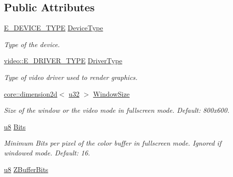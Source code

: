 \subsection*{Public Attributes}
\begin{DoxyCompactItemize}
\item 
\hyperlink{namespaceirr_ac25d94cf2e1037c7ca18ee79b3bd4505}{E\+\_\+\+D\+E\+V\+I\+C\+E\+\_\+\+T\+Y\+PE} \hyperlink{structirr_1_1SIrrlichtCreationParameters_a76520addbdf96ee3b3f00cb7f55076e5}{Device\+Type}
\begin{DoxyCompactList}\small\item\em Type of the device. \end{DoxyCompactList}\item 
\hyperlink{namespaceirr_1_1video_ae35a6de6d436c76107ad157fe42356d0}{video\+::\+E\+\_\+\+D\+R\+I\+V\+E\+R\+\_\+\+T\+Y\+PE} \hyperlink{structirr_1_1SIrrlichtCreationParameters_a1ea2f50c3b3a8eed6602a1a86e1cdf82}{Driver\+Type}
\begin{DoxyCompactList}\small\item\em Type of video driver used to render graphics. \end{DoxyCompactList}\item 
\hyperlink{classirr_1_1core_1_1dimension2d}{core\+::dimension2d}$<$ \hyperlink{namespaceirr_a0416a53257075833e7002efd0a18e804}{u32} $>$ \hyperlink{structirr_1_1SIrrlichtCreationParameters_a1b596e201a6ebd63ca2841d46be10433}{Window\+Size}\hypertarget{structirr_1_1SIrrlichtCreationParameters_a1b596e201a6ebd63ca2841d46be10433}{}\label{structirr_1_1SIrrlichtCreationParameters_a1b596e201a6ebd63ca2841d46be10433}

\begin{DoxyCompactList}\small\item\em Size of the window or the video mode in fullscreen mode. Default\+: 800x600. \end{DoxyCompactList}\item 
\hyperlink{namespaceirr_a646874f69af8ff87fc10201b0254a761}{u8} \hyperlink{structirr_1_1SIrrlichtCreationParameters_a0f7480557670df2d954ae217732a8773}{Bits}\hypertarget{structirr_1_1SIrrlichtCreationParameters_a0f7480557670df2d954ae217732a8773}{}\label{structirr_1_1SIrrlichtCreationParameters_a0f7480557670df2d954ae217732a8773}

\begin{DoxyCompactList}\small\item\em Minimum Bits per pixel of the color buffer in fullscreen mode. Ignored if windowed mode. Default\+: 16. \end{DoxyCompactList}\item 
\hyperlink{namespaceirr_a646874f69af8ff87fc10201b0254a761}{u8} \hyperlink{structirr_1_1SIrrlichtCreationParameters_ad34136ed6cd1532ed4e112f7ad72cbcf}{Z\+Buffer\+Bits}\hypertarget{structirr_1_1SIrrlichtCreationParameters_ad34136ed6cd1532ed4e112f7ad72cbcf}{}\label{structirr_1_1SIrrlichtCreationParameters_ad34136ed6cd1532ed4e112f7ad72cbcf}


\end{DoxyCompactItemize}
